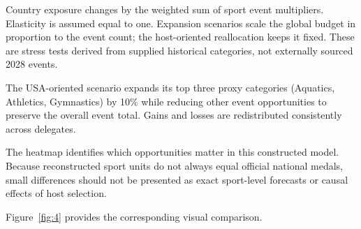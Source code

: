 \documentclass[11pt,a4paper]{article}
\begin{document}
Country exposure changes by the weighted sum of sport event multipliers. Elasticity is assumed equal to one. Expansion scenarios scale the global budget in proportion to the event count; the host-oriented reallocation keeps it fixed. These are stress tests derived from supplied historical categories, not externally sourced 2028 events.

The USA-oriented scenario expands its top three proxy categories (Aquatics, Athletics, Gymnastics) by 10\% while reducing other event opportunities to preserve the overall event total. Gains and losses are redistributed consistently across delegates.

The heatmap identifies which opportunities matter in this constructed model. Because reconstructed sport units do not always equal official national medals, small differences should not be presented as exact sport-level forecasts or causal effects of host selection.

Figure~\ref{fig:4} provides the corresponding visual comparison.
\end{document}
